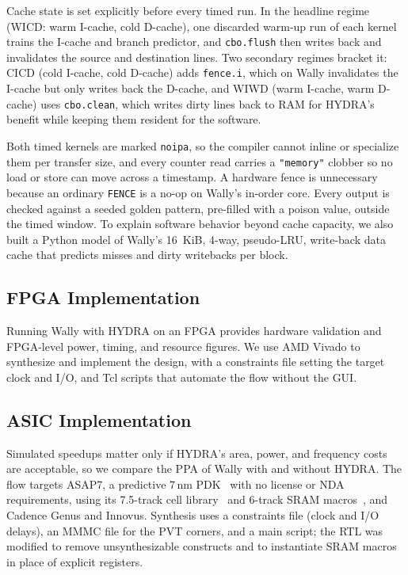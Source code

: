 \documentclass[conference]{IEEEtran}
\begin{document}
        Cache state is set explicitly before every timed run. In the
        headline regime (WICD: warm I-cache, cold D-cache), one
        discarded warm-up run of each kernel trains the I-cache and branch
        predictor, and \texttt{cbo.flush} then writes back and invalidates
        the source and destination lines. Two secondary regimes bracket
        it: CICD (cold I-cache, cold D-cache) adds \texttt{fence.i}, which
        on Wally invalidates the I-cache but only writes back the
        D-cache, and WIWD (warm I-cache, warm D-cache) uses
        \texttt{cbo.clean}, which writes dirty lines back to RAM for
        HYDRA's benefit while keeping them resident for the software.

        Both timed kernels are marked \texttt{noipa}, so the compiler
        cannot inline or specialize them per transfer size, and every
        counter read carries a \texttt{"memory"} clobber so no load or
        store can move across a timestamp. A hardware fence is unnecessary
        because an ordinary \texttt{FENCE} is a no-op on Wally's in-order
        core. Every output is checked against a seeded golden pattern,
        pre-filled with a poison value, outside the timed window. To
        explain software behavior beyond cache capacity, we also built a
        Python model of Wally's 16~KiB, 4-way, pseudo-LRU, write-back data
        cache that predicts misses and dirty writebacks per block.
    \subsection{FPGA Implementation}
        Running Wally with HYDRA on an FPGA provides hardware validation and
        FPGA-level power, timing, and resource figures. We use AMD Vivado to
        synthesize and implement the design, with a constraints file setting
        the target clock and I/O, and Tcl scripts that automate the flow
        without the GUI.
        
    \subsection{ASIC Implementation}
        Simulated speedups matter only if HYDRA's area, power, and frequency
        costs are acceptable, so we compare the PPA of Wally with and without
        HYDRA. The flow targets ASAP7, a predictive 7\,nm PDK~\cite{asap7pdk}
        with no license or NDA requirements, using its 7.5-track cell
        library~\cite{asap7cell} and 6-track SRAM macros~\cite{asap7sram},
        and Cadence Genus and Innovus. Synthesis uses a constraints file
        (clock and I/O delays), an MMMC file for the PVT corners, and a main
        script; the RTL was modified to remove unsynthesizable constructs and
        to instantiate SRAM macros in place of explicit registers.
        
\end{document}
